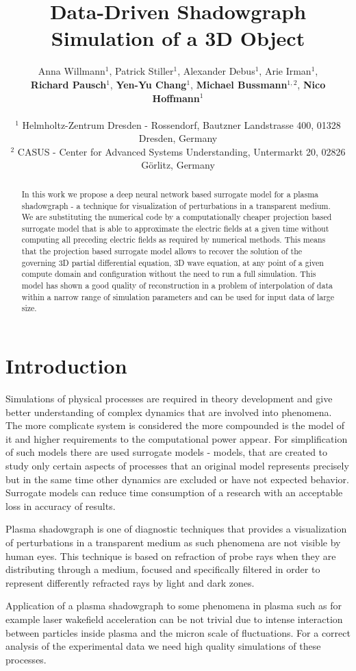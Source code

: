 \documentclass{article} %
\title{Data-Driven Shadowgraph Simulation of a 3D Object}
\author{Anna Willmann$^1$, Patrick Stiller$^1$, Alexander Debus$^1$, Arie Irman$^1$, \\ \textbf{Richard Pausch}$^1$,
\textbf{Yen-Yu Chang}$^1$, \textbf{Michael Bussmann}$^{1,2}$, \textbf{Nico Hoffmann}$^1$\\
\\
$^1$ Helmholtz-Zentrum Dresden - Rossendorf, Bautzner Landstrasse 400, 01328 Dresden, Germany\\
$^2$ CASUS - Center for Advanced Systems Understanding, Untermarkt 20, 02826 Görlitz, Germany
}
\begin{document}
\maketitle

\begin{abstract}
In this work we propose a deep neural network based surrogate model for a plasma shadowgraph - a technique for visualization of perturbations in a transparent medium.
We are substituting the numerical code by a computationally cheaper projection based surrogate model that is able to approximate the electric fields at a given time without computing all preceding electric fields as required by numerical methods. This means that the projection based surrogate model allows to recover the solution of the governing 3D partial differential equation, 3D wave equation, at any point of a given compute domain and configuration without the need to run a full simulation.
This model has shown a good quality of reconstruction in a problem of interpolation of data within a narrow range of simulation parameters and can be used for input data of large size.
\end{abstract}

\section{Introduction}
Simulations of physical processes are required in theory development and give better understanding of complex dynamics that are involved into phenomena. The more complicate system is considered the more compounded is the model of it and higher requirements to the computational power appear. For simplification of such models there are used surrogate models - models, that are created to study only certain aspects of processes that an original model represents precisely but in the same time other dynamics are excluded or have not expected behavior. Surrogate models can reduce time consumption of a research with an acceptable loss in accuracy of results.

Plasma shadowgraph is one of diagnostic techniques that provides a visualization of perturbations in a transparent medium as such phenomena are not visible by human eyes. This technique is based on refraction of probe rays when they are distributing through a medium, focused and specifically filtered in order to represent differently refracted rays by light and dark zones\citep{shadowg}.

Application of a plasma shadowgraph to some phenomena in plasma such as for example laser wakefield acceleration\citep{wakefield} can be not trivial due to intense interaction between particles inside plasma and the micron scale of fluctuations. For a correct analysis of the experimental data we need high quality simulations of these processes.
\end{document}
